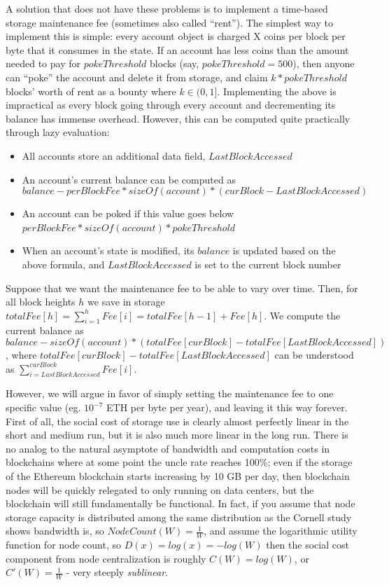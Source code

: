 \documentclass[12pt, final]{article}
\begin{document}
A solution that does not have these problems is to implement a time-based storage maintenance fee (sometimes also called ``rent''). The simplest way to implement this is simple: every account object is charged X coins per block per byte that it consumes in the state. If an account has less coins than the amount needed to pay for $pokeThreshold$ blocks (say, $pokeThreshold = 500$), then anyone can ``poke'' the account and delete it from storage, and claim $k * pokeThreshold$ blocks' worth of rent as a bounty where $k \in (0,1]$. Implementing the above is impractical as every block going through every account and decrementing its balance has immense overhead. However, this can be computed quite practically through lazy evaluation:

\begin{itemize}
\item All accounts store an additional data field, $LastBlockAccessed$
\item An account's current balance can be computed as $$balance - perBlockFee * sizeOf(account) * (curBlock - LastBlockAccessed)$$
\item An account can be poked if this value goes below $perBlockFee * sizeOf(account) * pokeThreshold$
\item When an account's state is modified, its $balance$ is updated based on the above formula, and $LastBlockAccessed$ is set to the current block number
\end{itemize}

Suppose that we want the maintenance fee to be able to vary over time. Then, for all block heights $h$ we save in storage $totalFee[h] = \sum_{i=1}^h Fee[i] = totalFee[h-1] + Fee[h]$. We compute the current balance as $$balance - sizeOf(account) * (totalFee[curBlock] - totalFee[LastBlockAccessed])$$, where $totalFee[curBlock] - totalFee[LastBlockAccessed]$ can be understood as $\sum_{i=LastBlockAccessed}^{curBlock} Fee[i]$.

However, we will argue in favor of simply setting the maintenance fee to one specific value (eg. $10^{-7}$ ETH per byte per year), and leaving it this way forever. First of all, the social cost of storage use is clearly almost perfectly linear in the short and medium run, but it is also much more linear in the long run. There is no analog to the natural asymptote of bandwidth and computation costs in blockchains where at some point the uncle rate reaches 100\%; even if the storage of the Ethereum blockchain starts increasing by 10 GB per day, then blockchain nodes will be quickly relegated to only running on data centers, but the blockchain will still fundamentally be functional. In fact, if you assume that node storage capacity is distributed among the same distribution as the Cornell study\cite{cornell} shows bandwidth is, so $NodeCount(W) = \frac{1}{W}$, and assume the logarithmic utility function for node count, so $D(x) = log(x) = -log(W)$ then the social cost component from node centralization is roughly $C(W) = log(W)$, or $C'(W) = \frac{1}{W}$ - very steeply \emph{sublinear}.
\end{document}
